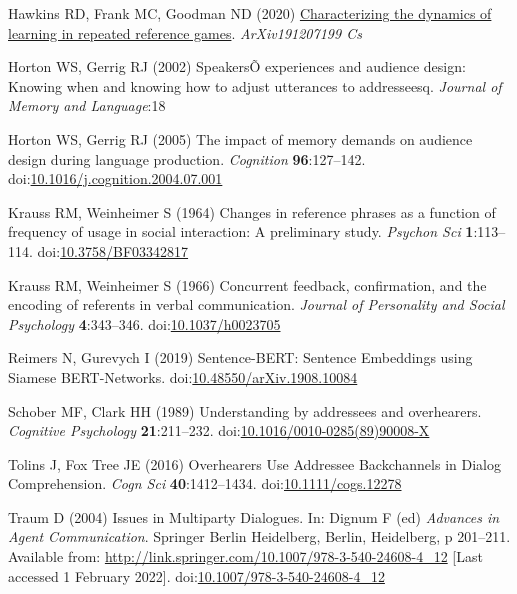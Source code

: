 \documentclass[
  english,
  a4paper,
]{article}
\newlength{\cslhangindent}
\newlength{\cslentryspacingunit} %
\newenvironment{CSLReferences}[2] %
 {%
  \setlength{\parindent}{0pt}
  \ifodd #1
  \let\oldpar\par
  \def\par{\hangindent=\cslhangindent\oldpar}
  \fi
  \setlength{\parskip}{#2\cslentryspacingunit}
 }%
 {}
\begin{document}
\begin{CSLReferences}{1}{0}
\leavevmode{}%
Hawkins RD, Frank MC, Goodman ND (2020) \href{http://arxiv.org/abs/1912.07199}{Characterizing the dynamics of learning in repeated reference games}. \emph{ArXiv191207199 Cs}

\leavevmode{}%
Horton WS, Gerrig RJ (2002) {SpeakersÕ} experiences and audience design: Knowing when and knowing how to adjust utterances to addresseesq. \emph{Journal of Memory and Language}:18

\leavevmode{}%
Horton WS, Gerrig RJ (2005) The impact of memory demands on audience design during language production. \emph{Cognition} \textbf{96}:127--142. doi:\href{https://doi.org/10.1016/j.cognition.2004.07.001}{10.1016/j.cognition.2004.07.001}

\leavevmode{}%
Krauss RM, Weinheimer S (1964) Changes in reference phrases as a function of frequency of usage in social interaction: A preliminary study. \emph{Psychon Sci} \textbf{1}:113--114. doi:\href{https://doi.org/10.3758/BF03342817}{10.3758/BF03342817}

\leavevmode{}%
Krauss RM, Weinheimer S (1966) Concurrent feedback, confirmation, and the encoding of referents in verbal communication. \emph{Journal of Personality and Social Psychology} \textbf{4}:343--346. doi:\href{https://doi.org/10.1037/h0023705}{10.1037/h0023705}

\leavevmode{}%
Reimers N, Gurevych I (2019) Sentence-{BERT}: {Sentence Embeddings} using {Siamese BERT-Networks}. doi:\href{https://doi.org/10.48550/arXiv.1908.10084}{10.48550/arXiv.1908.10084}

\leavevmode{}%
Schober MF, Clark HH (1989) Understanding by addressees and overhearers. \emph{Cognitive Psychology} \textbf{21}:211--232. doi:\href{https://doi.org/10.1016/0010-0285(89)90008-X}{10.1016/0010-0285(89)90008-X}

\leavevmode{}%
Tolins J, Fox Tree JE (2016) Overhearers {Use Addressee Backchannels} in {Dialog Comprehension}. \emph{Cogn Sci} \textbf{40}:1412--1434. doi:\href{https://doi.org/10.1111/cogs.12278}{10.1111/cogs.12278}

\leavevmode{}%
Traum D (2004) Issues in {Multiparty Dialogues}. In: Dignum F (ed) \emph{Advances in {Agent Communication}}. {Springer Berlin Heidelberg}, {Berlin, Heidelberg}, p 201--211. Available from: \url{http://link.springer.com/10.1007/978-3-540-24608-4_12} {[}Last accessed 1 February 2022{]}. doi:\href{https://doi.org/10.1007/978-3-540-24608-4_12}{10.1007/978-3-540-24608-4\_12}

\end{CSLReferences}
\end{document}
